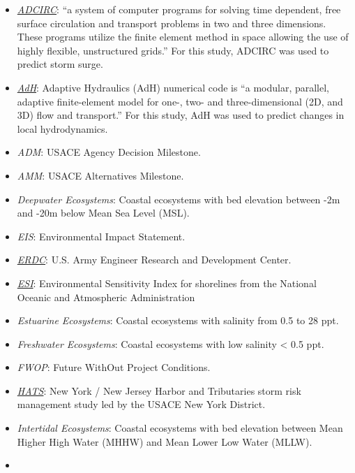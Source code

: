 \documentclass[
]{book}
\providecommand{\tightlist}{%
  \setlength{\itemsep}{0pt}\setlength{\parskip}{0pt}}
\begin{document}
\begin{itemize}
\tightlist
\item
  \emph{\href{https://adcirc.org/}{ADCIRC}}: ``a system of computer programs for solving time dependent, free surface circulation and transport problems in two and three dimensions. These programs utilize the finite element method in space allowing the use of highly flexible, unstructured grids.'' For this study, ADCIRC was used to predict storm surge.
\item
  \emph{\href{https://www.erdc.usace.army.mil/Media/Fact-Sheets/Fact-Sheet-Article-View/Article/476708/ada/}{AdH}}: Adaptive Hydraulics (AdH) numerical code is ``a modular, parallel, adaptive finite-element model for one-, two- and three-dimensional (2D, and 3D) flow and transport.'' For this study, AdH was used to predict changes in local hydrodynamics.
\item
  \emph{ADM}: USACE Agency Decision Milestone.
\item
  \emph{AMM}: USACE Alternatives Milestone.
\item
  \emph{Deepwater Ecosystems}: Coastal ecosystems with bed elevation between -2m and -20m below Mean Sea Level (MSL).
\item
  \emph{EIS}: Environmental Impact Statement.
\item
  \emph{\href{https://www.erdc.usace.army.mil/}{ERDC}}: U.S. Army Engineer Research and Development Center.
\item
  \emph{\href{https://response.restoration.noaa.gov/resources/environmental-sensitivity-index-esi-maps}{ESI}}: Environmental Sensitivity Index for shorelines from the National Oceanic and Atmospheric Administration
\item
  \emph{Estuarine Ecosystems}: Coastal ecosystems with salinity from 0.5 to 28 ppt.
\item
  \emph{Freshwater Ecosystems}: Coastal ecosystems with low salinity \textless{} 0.5 ppt.
\item
  \emph{FWOP}: Future WithOut Project Conditions.
\item
  \emph{\href{https://www.nan.usace.army.mil/Missions/Civil-Works/Projects-in-New-York/New-York-New-Jersey-Harbor-Tributaries-Focus-Area-Feasibility-Study/}{HATS}}: New York / New Jersey Harbor and Tributaries storm risk management study led by the USACE New York District.
\item
  \emph{Intertidal Ecosystems}: Coastal ecosystems with bed elevation between Mean Higher High Water (MHHW) and Mean Lower Low Water (MLLW).
\item

\end{itemize}
\end{document}
